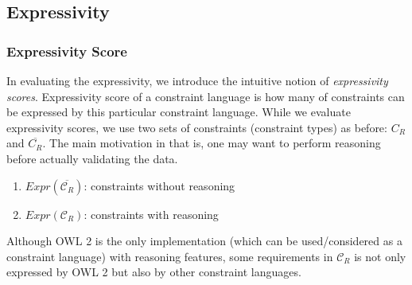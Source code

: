 \documentclass{llncs}
\newcommand{\ms}[1]{\texttt{#1}}
\newcommand{\tb}[1]{\todo[size=\small, color=green!40]{\textbf{Thomas:} #1}}
\newcommand{\er}[1]{\todo[size=\small, color=red!40]{\textbf{Erman:} #1}}
\begin{document}

\subsection{Expressivity}

\subsubsection{Expressivity Score}



In evaluating the expressivity,  we introduce the intuitive notion of \emph{expressivity scores}. Expressivity score of a constraint language is how many of constraints can be expressed by this particular constraint language.
While we evaluate expressivity scores, we use two sets of constraints (constraint types) as before: $C_R$ and $\overline{C_R}$. The main motivation in that is, one may want to perform reasoning before actually validating the data. 
\begin{enumerate}
	\item $Expr(\overline{\mathcal{C}_R})$: constraints without reasoning 
	\item $Expr(\mathcal{C}_R)$: constraints with reasoning
\end{enumerate}

Although  OWL 2  is the only implementation (which can be used/considered as a constraint language) with reasoning features, 
some requirements in $\mathcal{C}_R$ is not only expressed by OWL 2  but also by other constraint languages. 
\end{document}
